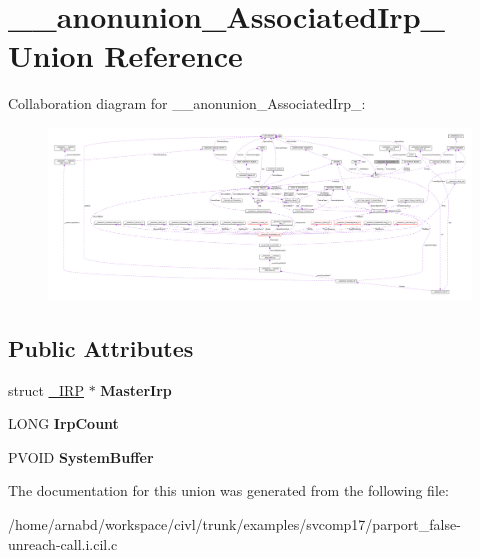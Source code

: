 \hypertarget{union____anonunion__AssociatedIrp__44}{}\section{\+\_\+\+\_\+anonunion\+\_\+\+Associated\+Irp\+\_ Union Reference}
\label{union____anonunion__AssociatedIrp__44}


Collaboration diagram for \+\_\+\+\_\+anonunion\+\_\+\+Associated\+Irp\+\_\+:
\nopagebreak
\begin{figure}[H]
\begin{center}
\leavevmode
\includegraphics[width=350pt]{union____anonunion__AssociatedIrp__44__coll__graph}
\end{center}
\end{figure}
\subsection*{Public Attributes}
\begin{DoxyCompactItemize}
\item 
\hypertarget{union____anonunion__AssociatedIrp__44_a5d82bc017ef36b670a8e621b7b2bc411}{}struct \hyperlink{struct__IRP}{\+\_\+\+I\+R\+P} $\ast$ {\bfseries Master\+Irp}\label{union____anonunion__AssociatedIrp__44_a5d82bc017ef36b670a8e621b7b2bc411}

\item 
\hypertarget{union____anonunion__AssociatedIrp__44_a8e3dfa6b58fd8ec92d0153f00d2fdbef}{}L\+O\+N\+G {\bfseries Irp\+Count}\label{union____anonunion__AssociatedIrp__44_a8e3dfa6b58fd8ec92d0153f00d2fdbef}

\item 
\hypertarget{union____anonunion__AssociatedIrp__44_ac4385ce985fc76c760f8a5a087a994cb}{}P\+V\+O\+I\+D {\bfseries System\+Buffer}\label{union____anonunion__AssociatedIrp__44_ac4385ce985fc76c760f8a5a087a994cb}

\end{DoxyCompactItemize}


The documentation for this union was generated from the following file\+:\begin{DoxyCompactItemize}
\item 
/home/arnabd/workspace/civl/trunk/examples/svcomp17/parport\+\_\+false-\/unreach-\/call.\+i.\+cil.\+c\end{DoxyCompactItemize}
